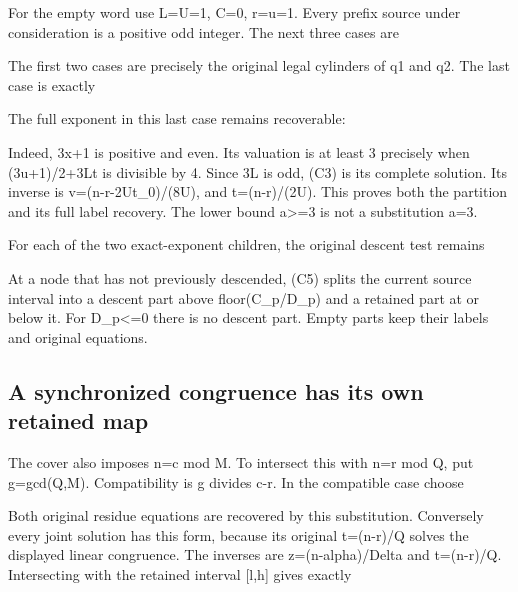 For the empty word use L=U=1, C=0, r=u=1. Every prefix source under
consideration is a positive odd integer. The next three cases are


The first two cases are precisely the original legal cylinders of q1 and
q2. The last case is exactly


The full exponent in this last case remains recoverable:


Indeed, 3x+1 is positive and even. Its valuation is at least 3 precisely
when (3u+1)/2+3Lt is divisible by 4. Since 3L is odd, (C3) is its
complete solution. Its inverse is v=(n-r-2Ut\_0)/(8U), and t=(n-r)/(2U).
This proves both the partition and its full label recovery. The lower
bound a\textgreater=3 is not a substitution a=3.

For each of the two exact-exponent children, the original descent test
remains


At a node that has not previously descended, (C5) splits the current
source interval into a descent part above floor(C\_p/D\_p) and a
retained part at or below it. For D\_p\textless=0 there is no descent
part. Empty parts keep their labels and original equations.

\subsection{A synchronized congruence has its own retained map}

The cover also imposes n=c mod M. To intersect this with n=r mod Q, put
g=gcd(Q,M). Compatibility is g divides c-r. In the compatible case
choose


Both original residue equations are recovered by this substitution.
Conversely every joint solution has this form, because its original
t=(n-r)/Q solves the displayed linear congruence. The inverses are
z=(n-alpha)/Delta and t=(n-r)/Q. Intersecting with the retained interval
{[}l,h{]} gives exactly

